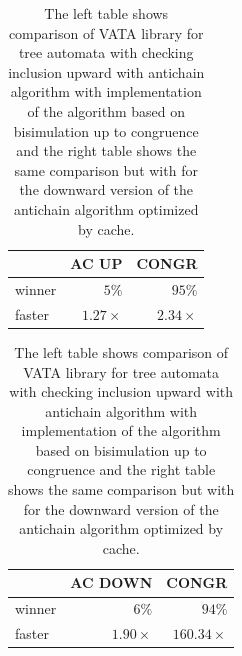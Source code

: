 \begin{table}[bt]
\begin{center}
\parbox{.45\linewidth}{
  \begin{tabular}[scale=0.3]{ | l | r | r |}
   \hline
    & \textbf{AC UP} & \textbf{CONGR} \\ \hline \hline
    winner & $5\%$ & $95\%$ \\ \hline
    faster & $1.27\times$ & $2.34\times$ \\ \hline
   \end{tabular}
}
   \parbox{.45\linewidth}{
  \begin{tabular}{ | l | r | r |}
   \hline
    & \textbf{AC DOWN} & \textbf{CONGR} \\ \hline \hline
    winner & $6\%$ & $94\%$ \\ \hline
    faster & $1.90\times$ & $160.34\times$ \\ \hline
   \end{tabular}
   }
   \caption{The left table shows comparison of VATA library for tree automata with checking inclusion upward with antichain algorithm with
       implementation of the algorithm based on bisimulation up to congruence and
   the right table shows the same comparison but with for the downward version of the antichain algorithm optimized by cache.}
   \label{tabAc}
\end{center}
\end{table}

